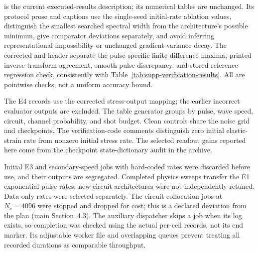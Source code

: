 \documentclass[11pt]{article}
\begin{document}
 is the current executed-results description;
its numerical tables are unchanged. Its protocol prose and captions use
the single-seed initial-rate ablation values, distinguish the smallest
searched spectral width from the architecture's possible minimum, give
comparator deviations separately, and avoid inferring representational
impossibility or unchanged gradient-variance decay. The corrected
 and  header separate
the pulse-specific finite-difference maxima, printed inverse-transform
agreement, smooth-pulse discrepancy, and stored-reference regression
check, consistently with Table~\ref{tab:supp-verification-results}.
All are pointwise checks, not a uniform accuracy bound.

The E4 records use the corrected stress-output mapping; the earlier
incorrect evaluator outputs are excluded. The table generator groups by
pulse, wave speed, circuit, channel probability, and shot budget.
Clean controls share the noise grid and checkpoints. The verification-code
comments distinguish zero initial elastic-strain rate from nonzero
initial stress rate. The selected readout gains reported here come from
the checkpoint state-dictionary audit in the archive.

Initial E3 and secondary-speed jobs with hard-coded rates were discarded
before use, and their outputs are segregated. Completed physics sweeps
transfer the E1 exponential-pulse rates; new circuit architectures were
not independently retuned. Data-only rates were selected separately.
The circuit collocation jobs at $N_c=4096$ were stopped and dropped for
cost; this is a declared deviation from the plan (main Section~4.3). The auxiliary dispatcher skips a job when its
log exists, so completion was checked using the actual per-cell records,
not its end marker. Its adjustable worker file and overlapping queues
prevent treating all recorded durations as comparable throughput.
\end{document}
